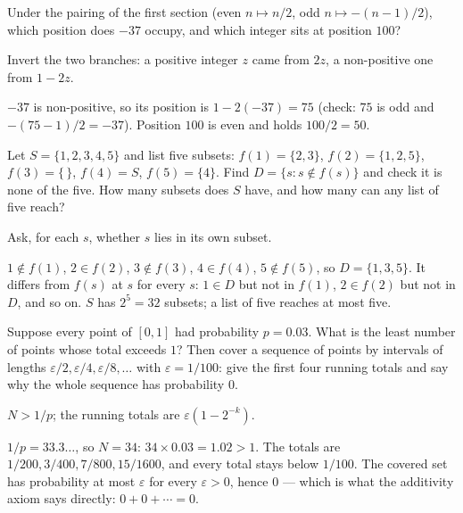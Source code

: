 \begin{problem}
Under the pairing of the first section (even $n \mapsto n/2$, odd $n
\mapsto -(n-1)/2$), which position does $-37$ occupy, and which integer
sits at position $100$?
\begin{hint}
Invert the two branches: a positive integer $z$ came from $2z$, a
non-positive one from $1 - 2z$.
\end{hint}
\begin{solution}
$-37$ is non-positive, so its position is $1 - 2(-37) = 75$ (check:
$75$ is odd and $-(75 - 1)/2 = -37$). Position $100$ is even and holds
$100/2 = 50$.
\end{solution}
\end{problem}

\begin{problem}
Let $S = \{1, 2, 3, 4, 5\}$ and list five subsets: $f(1) = \{2, 3\}$,
$f(2) = \{1, 2, 5\}$, $f(3) = \{\,\}$, $f(4) = S$, $f(5) = \{4\}$. Find
$D = \{s : s \notin f(s)\}$ and check it is none of the five. How many
subsets does $S$ have, and how many can any list of five reach?
\begin{hint}
Ask, for each $s$, whether $s$ lies in its own subset.
\end{hint}
\begin{solution}
$1 \notin f(1)$, $2 \in f(2)$, $3 \notin f(3)$, $4 \in f(4)$, $5 \notin
f(5)$, so $D = \{1, 3, 5\}$. It differs from $f(s)$ at $s$ for every
$s$: $1 \in D$ but not in $f(1)$, $2 \in f(2)$ but not in $D$, and so
on. $S$ has $2^5 = 32$ subsets; a list of five reaches at most five.
\end{solution}
\end{problem}

\begin{problem}[stretch]
Suppose every point of $[0,1]$ had probability $p = 0.03$. What is the
least number of points whose total exceeds $1$? Then cover a sequence
of points by intervals of lengths $\varepsilon/2, \varepsilon/4,
\varepsilon/8, \ldots$ with $\varepsilon = 1/100$: give the first four
running totals and say why the whole sequence has probability $0$.
\begin{hint}
$N > 1/p$; the running totals are $\varepsilon(1 - 2^{-k})$.
\end{hint}
\begin{solution}
$1/p = 33.3\ldots$, so $N = 34$: $34 \times 0.03 = 1.02 > 1$. The
totals are $1/200, 3/400, 7/800, 15/1600$, and every total stays below
$1/100$. The covered set has probability at most $\varepsilon$ for
every $\varepsilon > 0$, hence $0$ — which is what the additivity axiom
says directly: $0 + 0 + \cdots = 0$.
\end{solution}
\end{problem}
